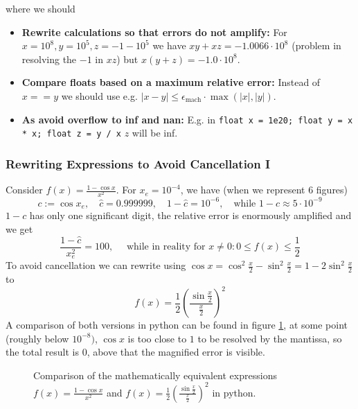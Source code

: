 where we should
\begin{itemize}
    \item \textcolor{green1}{\textbf{Rewrite calculations so that errors do not amplify:}} For $x = 10^8, y = 10^5, z = - 1 - 10^5$ we have $xy+xz=-1.0066\cdot10^8$ (problem in resolving the $-1$ in $xz$) but $x(y+z) = -1.0\cdot10^8$.
    \item \textcolor{green1}{\textbf{Compare floats based on a maximum relative error:}} Instead of $x == y$ we should use e.g. $|x-y| \leq \epsilon_{\text{mach}} \cdot \max(|x|,|y|)$.
    \item \textcolor{green1}{\textbf{As avoid overflow to inf and nan:}} E.g. in \texttt{float x = 1e20; float y = x * x; float z = y / x} $z$ will be inf. 
\end{itemize}

\subsubsection{Rewriting Expressions to Avoid Cancellation I}
Consider $f(x) = \frac{1-\cos x}{x^2}$. For $x_e = 10^{-4}$, we have (when we represent 6 figures)
\begin{equation}
    c := \cos x_e, \quad \hat{c} = 0.999999, \quad 1-\hat{c} = 10^{-6}, \quad \text{while } 1-c \approx 5\cdot 10^{-9}
\end{equation}
$1-c$ has only one significant digit, the relative error is enormously amplified and we get
\begin{equation}
    \frac{1-\hat{c}}{x_e^2} = 100, \quad \text{ while in reality for } x\ne 0: 0 \leq f(x) \leq \frac{1}{2} 
\end{equation}
To avoid cancellation we can rewrite using $\cos x = \cos^2 \frac{x}{2} - \sin^2 \frac{x}{2} = 1 - 2 \sin^2 \frac{x}{2}$ to
\begin{equation}
    f(x) = \frac{1}{2} \left( \frac{\sin \frac{x}{2}}{\frac{x}{2}} \right)^2
\end{equation}
A comparison of both versions in python can be found in figure \ref{fig:cancellation_ex}, at some point (roughly below $10^{-8})$, $\cos x$ is too close to $1$ to be resolved by the mantissa, so the total result is $0$, above that the magnified error is visible.

\begin{figure}[!htb]
    \centering
    \hfill
    \caption{Comparison of the mathematically equivalent expressions $f(x) = \frac{1-\cos x}{x^2}$ and $f(x) = \frac{1}{2} \left( \frac{\sin \frac{x}{2}}{\frac{x}{2}} \right)^2$ in python.}
    \label{fig:cancellation_ex}
\end{figure}

